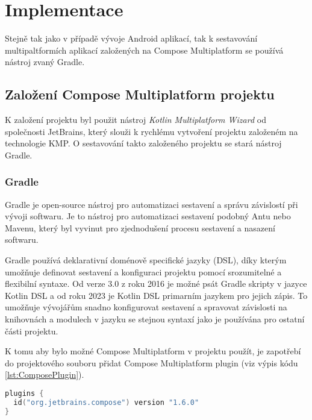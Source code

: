 \chapter{Implementace}
Stejně tak jako v případě vývoje Android aplikací, tak k sestavování multipaltformích aplikací založených na Compose Multiplatform 
se používá nástroj zvaný Gradle.  

\section{Založení Compose Multiplatform projektu}
K založení projektu byl použit nástroj \textit{Kotlin Multiplatform Wizard} od společnosti JetBrains, který slouži k rychlému vytvoření projektu
založeném na technologie KMP. O sestavování takto založeného projektu se stará nástroj Gradle.

\subsection{Gradle} \label{gradleChapter}
Gradle je open-source nástroj pro automatizaci sestavení a správu závislostí při vývoji softwaru. Je to nástroj pro automatizaci sestavení 
podobný Antu nebo Mavenu, který byl vyvinut pro zjednodušení procesu sestavení a nasazení softwaru.

Gradle používá deklarativní doménově specifické jazyky (DSL), díky kterým umožňuje definovat sestavení a konfiguraci projektu pomocí srozumitelné
a flexibilní syntaxe. Od verze 3.0 z roku 2016 je možné psát Gradle skripty v jazyce Kotlin DSL a od roku 2023 je Kotlin DSL primarním jazykem 
pro jejich zápis. To umožňuje vývojářům snadno konfigurovat sestavení a spravovat závislosti na knihovnách a modulech v jazyku se stejnou
syntaxí jako je používána pro ostatní části projektu.


K tomu aby bylo možné Compose Multiplatform v projektu použít, je zapotřebí do projektového souboru  přidat Compose 
Multiplatform plugin (viz výpis kódu \ref{lst:ComposePlugin}).

\begin{lstlisting}[caption={Integrace Compose Multiplatform pluginu do sestavovacího scriptu}, label={lst:ComposePlugin}, language=Kotlin]
plugins {
  id("org.jetbrains.compose") version "1.6.0"
}
\end{lstlisting}

